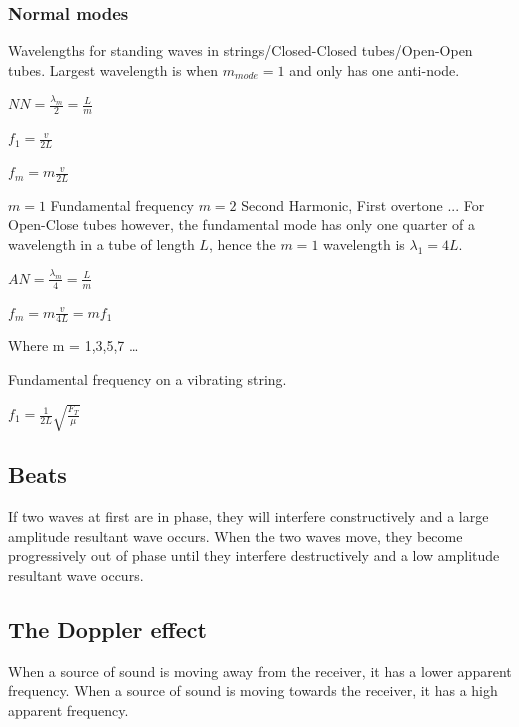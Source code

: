 \documentclass[a4paper]{article}
\begin{document}
\subsubsection{Normal modes}
Wavelengths for standing waves in strings/Closed-Closed tubes/Open-Open tubes. Largest wavelength is when $m_{mode} = 1$ and only has one anti-node.
\begin{center}
$NN = \displaystyle\frac{\lambda_{m}}{2} = \frac{L}{m}$
\end{center}
\begin{center}
$f_1 = \displaystyle\frac{v}{2L}$
\end{center}
\begin{center}
$f_m = \displaystyle m\frac{v}{2L}$
\end{center}
$m = 1$ Fundamental frequency
\newline
$m = 2$ Second Harmonic, First overtone
\newline
$...$
\newline
For Open-Close tubes however, the fundamental mode has only one quarter of a wavelength in a tube of length $L$, hence the $m = 1$ wavelength is $\lambda_1 = 4L$.
\begin{center}
$AN = \displaystyle\frac{\lambda_m}{4} = \frac{L}{m}$
\end{center}
\begin{center}
$f_m = \displaystyle m\frac{v}{4L} = mf_1$
\end{center}
\begin{center}
Where m = 1,3,5,7 \ldots
\end{center}
Fundamental frequency on a vibrating string.
\begin{center}
$f_1 = \displaystyle\frac{1}{2L}\sqrt{\frac{F_T}{\mu}}$
\end{center}

\subsection{Beats}
If two waves at first are in phase, they will interfere constructively and a large amplitude resultant wave occurs. When the two waves move, they become progressively out of phase until they interfere destructively and a low amplitude resultant wave occurs. 
\subsection{The Doppler effect}
When a source of sound is moving away from the receiver, it has a lower apparent frequency. When a source of sound is moving towards the receiver, it has a high apparent frequency.  
\end{document}
